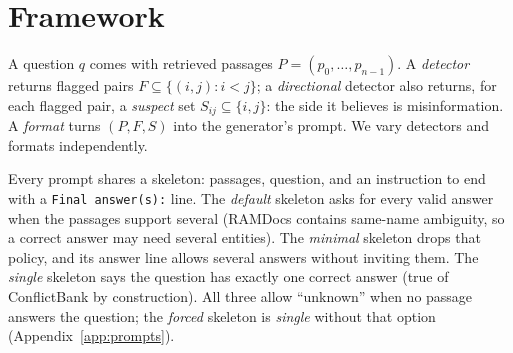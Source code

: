\section{Framework}
\label{sec:method}

A question $q$ comes with retrieved passages $P=(p_0,\dots,p_{n-1})$. A \emph{detector} returns flagged pairs
$F\subseteq\{(i,j): i<j\}$; a \emph{directional} detector also returns, for each flagged pair, a \emph{suspect}
set $S_{ij}\subseteq\{i,j\}$: the side it believes is misinformation. A \emph{format} turns $(P,F,S)$ into the
generator's prompt. We vary detectors and formats independently.

Every prompt shares a skeleton: passages, question,
and an instruction to end with a \texttt{Final answer(s):} line. The \emph{default} skeleton asks for every valid
answer when the passages support several (RAMDocs contains same-name ambiguity, so a correct answer may need several
entities). The \emph{minimal} skeleton drops that policy, and its answer line allows several answers without inviting
them. The \emph{single} skeleton says the question has exactly one correct answer (true of ConflictBank by
construction). All three allow ``unknown'' when no passage answers the question; the \emph{forced} skeleton is
\emph{single} without that option (Appendix~\ref{app:prompts}).

